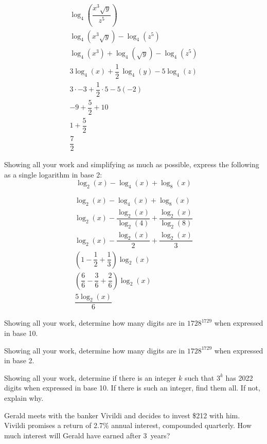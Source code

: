 \documentclass[12pt,letterpaper]{exam}
\begin{document}
\begin{questions}
	\begin{gather*}
	\log_4 \left( \dfrac{x^3 \sqrt{y}}{z^5} \right) \\[0.3cm]
	\log_4(x^3 \sqrt{y}) - \log_4(z^5) \\[0.3cm]
	\log_4(x^3) + \log_4(\sqrt{y}) - \log_4(z^5) \\[0.3cm]
	3 \log_4(x) + \dfrac{1}{2}\, \log_4(y) - 5 \log_4(z) \\[0.3cm]
	3 \cdot -3 + \dfrac{1}{2} \cdot 5 - 5(-2) \\[0.3cm]
	-9 + \dfrac{5}{2} + 10 \\[0.3cm]
	1 + \dfrac{5}{2} \\[0.3cm]
	\dfrac{7}{2}
	\end{gather*}



\newpage
\question[10] Showing all your work and simplifying as much as possible, express the following as a single logarithm in base 2:
	\[
	\log_2(x) - \log_4(x) + \log_8(x)
	\] \pspace
	
	\begin{gather*}
	\log_2(x) - \log_4(x) + \log_8(x) \\[0.3cm]
	\log_2(x) - \dfrac{\log_2(x)}{\log_2(4)} + \dfrac{\log_2(x)}{\log_2(8)} \\[0.3cm]
	\log_2(x) - \dfrac{\log_2(x)}{2} + \dfrac{\log_2(x)}{3} \\[0.3cm]
	\left(1 - \dfrac{1}{2} + \dfrac{1}{3} \right) \log_2(x) \\[0.3cm]
	\left( \dfrac{6}{6} - \dfrac{3}{6} + \dfrac{2}{6} \right) \log_2(x) \\[0.3cm]
	\dfrac{5 \log_2(x)}{6}
	\end{gather*}



\newpage
\question[10] Showing all your work, determine how many digits are in $1728^{1729}$ when expressed in base 10. 



\newpage
\question[10] Showing all your work, determine how many digits are in $1728^{1729}$ when expressed in base 2. 



\newpage
\question[10] Showing all your work, determine if there is an integer $k$ such that $3^k$ has 2022 digits when expressed in base 10. If there is such an integer, find them all. If not, explain why. 



\newpage
\question[10] Gerald meets with the banker Vivildi and decides to invest \$212 with him. Vivildi promises a return of 2.7\% annual interest, compounded quarterly. How much interest will Gerald have earned after 3~years?




\end{questions}
\end{document}
